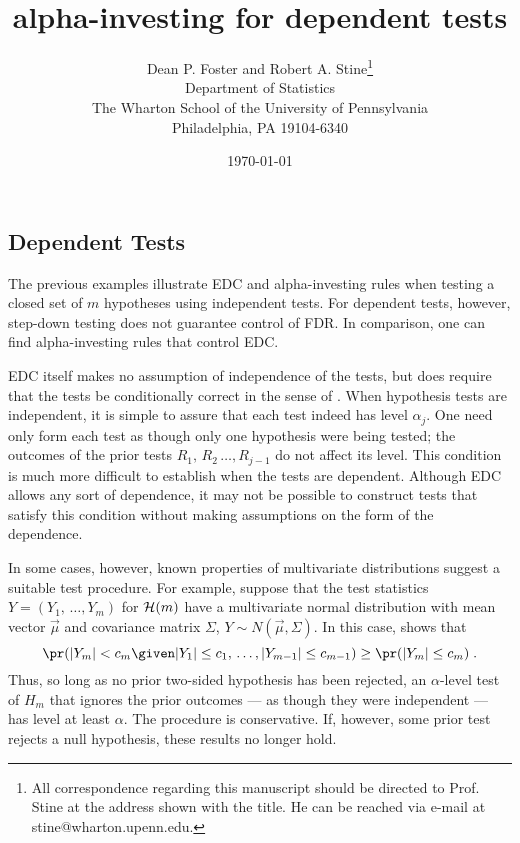 \documentclass[12pt]{article}
\title{  
         alpha-investing for dependent tests
}
\author{
        Dean P. Foster and Robert A. Stine\footnote{All correspondence
regarding this manuscript should be directed to Prof. Stine at 
the address shown with the title.  He can be reached via e-mail at
stine@wharton.upenn.edu.}                                    \\
        Department of Statistics                             \\
        The Wharton School of the University of Pennsylvania \\
        Philadelphia, PA 19104-6340                          \\
}
\date{\today}
\newcommand{\dpf}[1]{\noindent{\textcolor{Blue}{\{{\bf dpf:} \em
#1\}}}}
\begin{document}
\maketitle 

\dpf{Cut from the other paper.}


\subsection{Dependent Tests}


The previous examples illustrate EDC and alpha-investing rules when
testing a closed set of $m$ hypotheses using independent tests.  For
dependent tests, however, step-down testing does not guarantee control
of FDR.  In comparison, one can find alpha-investing rules that
control EDC.


EDC itself makes no assumption of independence of the tests, but
does require that the tests be conditionally correct in the sense of
.  When hypothesis tests are independent, it is simple
to assure that each test indeed has level $\alpha_j$.  One need only form
each test as though only one hypothesis were being tested; the
outcomes of the prior tests $R_1,\, R_2\, \ldots, R_{j-1}$ do not
affect its level.  This condition is much more difficult to establish
when the tests are dependent.  Although EDC allows any sort of
dependence, it may not be possible to construct tests that satisfy
this condition without making assumptions on the form of the
dependence.


In some cases, however, known properties of multivariate distributions
suggest a suitable test procedure.  For example, suppose that the test
statistics $Y = (Y_1,\, \ldots, Y_m)$ for ${\cal H}(m)$ have a
multivariate normal distribution with mean vector $\vec\mu$ and
covariance matrix $\Sigma$, $Y \sim N(\vec\mu, \Sigma)$.  In this
case, \citet{dykstra80} shows that
\begin{equation}
   \pr(|Y_m| < c_m \given |Y_1| \le c_1,\, \ldots, |Y_{m-1}| \le c_{m-1})
   \ge \pr(|Y_m| \le c_m)   \;.
\label{eq:dyk}
\end{equation}
Thus, so long as no prior two-sided hypothesis has been rejected, an
$\alpha$-level test of $H_m$ that ignores the prior outcomes --- as
though they were independent ---  has level at least $\alpha$.
The procedure is conservative.  If, however, some prior test rejects a
null hypothesis, these results no longer hold.
\end{document}
